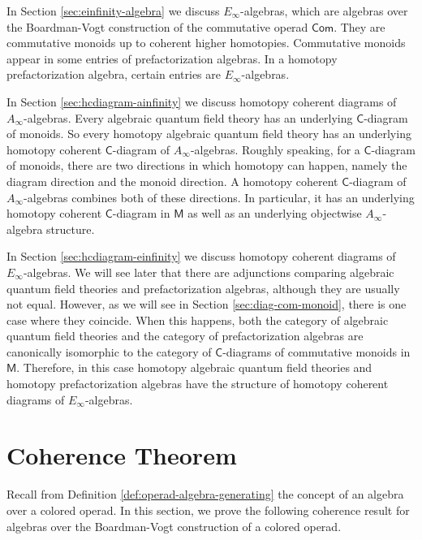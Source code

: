 \documentclass[11pt]{amsbook}
\numberwithin{section}{chapter}
\numberwithin{subsection}{section}
\numberwithin{equation}{section}
\theoremstyle{plain}
\theoremstyle{definition}
\newcommand{\C}{\mathsf{C}}
\newcommand{\M}{\mathsf{M}}
\newcommand{\Com}{\mathsf{Com}}
\begin{document}
In Section \ref{sec:einfinity-algebra} we discuss $E_{\infty}$-algebras, which are algebras over the Boardman-Vogt construction of the commutative operad $\Com$.  They are commutative monoids up to coherent higher homotopies.  Commutative monoids appear in some entries of prefactorization algebras.  In a homotopy prefactorization algebra, certain entries are $E_\infty$-algebras.  

In Section \ref{sec:hcdiagram-ainfinity} we discuss homotopy coherent diagrams of $A_\infty$-algebras.  Every algebraic quantum field theory has an underlying $\C$-diagram of monoids.  So every homotopy algebraic quantum field theory has an underlying homotopy coherent $\C$-diagram  of $A_\infty$-algebras.  Roughly speaking, for a $\C$-diagram of monoids, there are two directions in which homotopy can happen, namely the diagram direction and the monoid direction.  A homotopy coherent $\C$-diagram of $A_\infty$-algebras combines both of these directions.  In particular, it has an underlying homotopy coherent $\C$-diagram in $\M$ as well as an underlying objectwise $A_\infty$-algebra structure.

In Section \ref{sec:hcdiagram-einfinity} we discuss homotopy coherent diagrams of $E_\infty$-algebras. We will see later that there are adjunctions comparing algebraic quantum field theories and prefactorization algebras, although they are usually not equal.  However, as we will see in Section  \ref{sec:diag-com-monoid}, there is one case where they coincide.  When this happens, both the category of algebraic quantum field theories and the category of prefactorization algebras are canonically isomorphic to the category of $\C$-diagrams of commutative monoids in $\M$.  Therefore, in this case homotopy algebraic quantum field theories and homotopy prefactorization algebras have the structure of homotopy coherent diagrams of $E_\infty$-algebras.


\section{Coherence Theorem}\label{sec:algebra-bv}

Recall from Definition \ref{def:operad-algebra-generating} the concept of an algebra over a colored operad.  In this section, we prove the following coherence result for algebras over the Boardman-Vogt construction of a colored operad.
\end{document}
